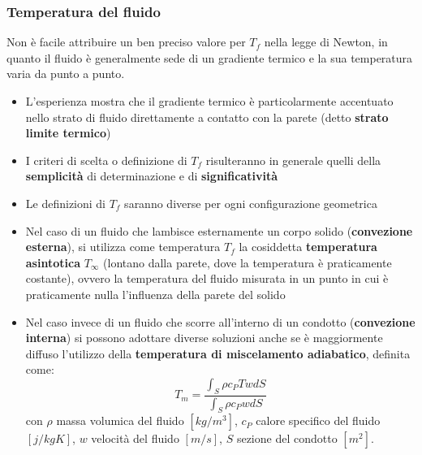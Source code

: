 \subsubsection{Temperatura del fluido}
Non è facile attribuire un ben preciso valore per $T_f$ nella legge di Newton, in
quanto il fluido è generalmente sede di un gradiente termico e la sua temperatura
varia da punto a punto.
\begin{itemize}
    \item L’esperienza mostra che il gradiente termico è particolarmente accentuato
    nello strato di fluido direttamente a contatto con la parete (detto \textbf{strato limite
    termico})
    \item I criteri di scelta o definizione di $T_f$ risulteranno in generale quelli della
    \textbf{semplicità} di determinazione e di \textbf{significatività}
    \item Le definizioni di $T_f$ saranno diverse per ogni configurazione geometrica
    \item Nel caso di un fluido che lambisce esternamente un corpo solido (\textbf{convezione
    esterna}), si utilizza come temperatura $T_f$ la cosiddetta \textbf{temperatura
    asintotica} $T_\infty$ (lontano dalla parete, dove la temperatura è praticamente costante), ovvero la temperatura del fluido misurata in un punto in cui è
    praticamente nulla l’influenza della parete del solido
    \item Nel caso invece di un fluido che scorre all’interno di un condotto (\textbf{convezione
    interna}) si possono adottare diverse soluzioni anche se è maggiormente
    diffuso l’utilizzo della \textbf{temperatura di miscelamento adiabatico}, definita
    come:
    \[
        T_m = \frac{\int_{S}\rho c_P T w dS}{\int_{S}\rho c_P w dS}
    \]
    con $\rho$ massa volumica del fluido $[kg/m^3]$, $c_P$ calore specifico del fluido $[j/kgK]$, $w$ velocità del fluido $[m/s]$, $S$ sezione del condotto $[m^2]$.
\end{itemize}
